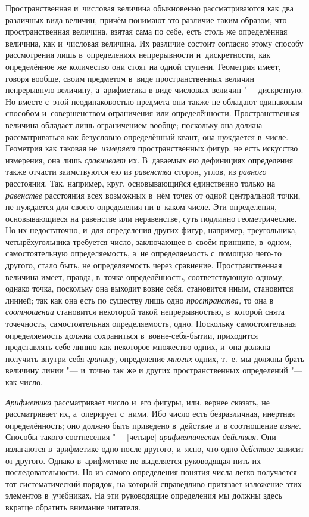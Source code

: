 
Пространственная и~числовая величина обыкновенно рассматриваются как два
различных вида величин, причём понимают это различие таким образом, что
пространственная величина, взятая сама по себе, есть столь же определённая
величина, как и~числовая величина. Их различие состоит согласно этому способу
рассмотрения лишь в~определениях непрерывности и~дискретности, как определённое
же количество они стоят на одной ступени. Геометрия имеет, говоря вообще, своим
предметом в~виде пространственных величин непрерывную величину, а~арифметика в
виде числовых величин "--- дискретную. Но вместе с~этой неодинаковостью
предмета они также не обладают одинаковым способом и~совершенством ограничения
или определённости. Пространственная величина обладает лишь ограничением
вообще; поскольку она должна рассматриваться как безусловно определённый
квант, она нуждается в~числе. Геометрия как таковая не~{\em измеряет}
пространственных фигур, не есть искусство измерения, она лишь {\em сравнивает}
их. В~даваемых ею дефинициях определения также отчасти заимствуются ею из
{\em равенства} сторон, углов, из {\em равного} расстояния. Так, например,
круг, основывающийся единственно только на {\em равенстве} расстояния всех
возможных в~нём точек от одной центральной точки, не нуждается для своего
определения ни в~каком числе. Эти определения, основывающиеся на равенстве или
неравенстве, суть подлинно геометрические. Но их недостаточно, и~для
определения других фигур, например, треугольника, четырёхугольника требуется
число, заключающее в~своём принципе, в~одном, самостоятельную определяемость,
а~не определяемость с~помощью чего-то другого, стало быть, не определяемость
через сравнение. Пространственная величина имеет, правда, в~точке
определённость, соответствующую одному; однако точка, поскольку она выходит вовне
себя, становится иным, становится линией; так как она есть по существу
лишь одно {\em пространства,} то она в {\em соотношении} становится некоторой
такой непрерывностью, в~которой снята точечность, самостоятельная
определяемость, одно. Поскольку самостоятельная определяемость должна
сохраниться в~вовне-себя-бытии, приходится представлять себе линию как некоторое
множество одних, и~она должна получить внутри себя {\em границу,} определение
{\em многих} одних, т.~е. мы должны брать величину линии "--- и~точно так же и
других пространственных определений "--- как число.

{\em Арифметика} рассматривает число и~его фигуры, или, вернее сказать, не
рассматривает их, а~оперирует с~ними. Ибо число есть безразличная, инертная
определённость; оно должно быть приведено в~действие и~в соотношение
{\em извне}. Способы такого соотнесения "--- [четыре] {\em арифметических действия}.
Они излагаются в~арифметике одно после другого, и~ясно, что одно {\em действие}
зависит от другого. Однако в~арифметике не выделяется руководящая нить их
последовательности. Но из самого определения понятия числа легко получается тот
систематический порядок, на который справедливо притязает изложение этих
элементов в~учебниках. На эти руководящие определения мы должны здесь вкратце
обратить внимание читателя.

